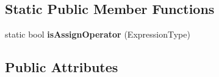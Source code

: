 \subsection*{Static Public Member Functions}
\begin{DoxyCompactItemize}
\item 
static bool {\bfseries is\+Assign\+Operator} (Expression\+Type)\hypertarget{struct_object_script_1_1_o_s_1_1_core_1_1_compiler_1_1_expression_a1398028f43814e6129280f4d881f4f1a}{}\label{struct_object_script_1_1_o_s_1_1_core_1_1_compiler_1_1_expression_a1398028f43814e6129280f4d881f4f1a}

\end{DoxyCompactItemize}
\subsection*{Public Attributes}
